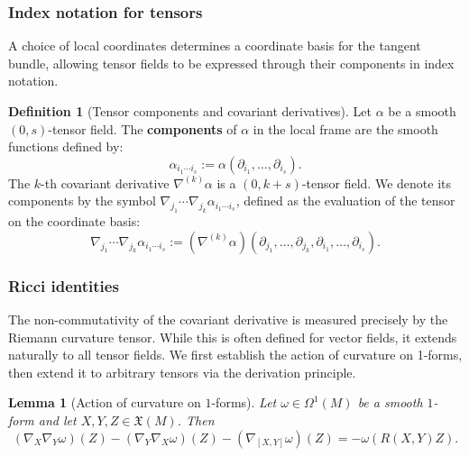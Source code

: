 \documentclass[11pt]{article}
\theoremstyle{plain}
\newtheorem{lemma}[theorem]{Lemma}
\theoremstyle{definition}
\newtheorem{definition}[theorem]{Definition}
\theoremstyle{remark}
\begin{document}
\subsubsection{Index notation for tensors}


A choice of local coordinates determines a coordinate basis for the
tangent bundle, allowing tensor fields to be expressed through their
components in index notation.

\begin{definition}[Tensor components and covariant derivatives]
\label{def:tensor_components}
    Let $\alpha$ be a smooth $(0,s)$-tensor field. The \textbf{components} of $\alpha$ in the local frame are the smooth functions defined by:
    \begin{equation}
        \alpha_{i_1 \cdots i_s} := \alpha (\partial_{i_1}, \ldots, \partial_{i_s}).
    \end{equation}
    The $k$-th covariant derivative $\nabla^{(k)} \alpha$ is a $(0, k+s)$-tensor field. We denote its components by the symbol $\nabla_{j_1}\cdots \nabla_{j_k} \alpha_{i_1 \cdots i_s}$, defined as the evaluation of the tensor on the coordinate basis:
    \begin{equation}
        \nabla_{j_1}\cdots \nabla_{j_k} \alpha_{i_1 \cdots i_s} := (\nabla^{(k)}\alpha) (\partial_{j_1}, \ldots, \partial_{j_k}, \partial_{i_1}, \ldots, \partial_{i_s}).
    \end{equation}
\end{definition}

\subsubsection{Ricci identities}

The non-commutativity of the covariant derivative is measured precisely by the Riemann curvature tensor. While this is often defined for vector fields, it extends naturally to all tensor fields. We first establish the action of curvature on 1-forms, then extend it to arbitrary tensors via the derivation principle.

\begin{lemma}[Action of curvature on $1$-forms]
\label{lem:curvature_on_1forms}
    Let $\omega \in \Omega^1(M)$ be a smooth $1$-form and let $X, Y, Z \in \mathfrak{X}(M)$. Then
    \begin{equation}\label{eq:ricci-identity-one-form}
        (\nabla_X \nabla_Y \omega)(Z) - (\nabla_Y \nabla_X \omega)(Z) - (\nabla_{[X,Y]} \omega)(Z) = - \omega(R(X,Y)Z).
    \end{equation}
\end{lemma}
\end{document}
